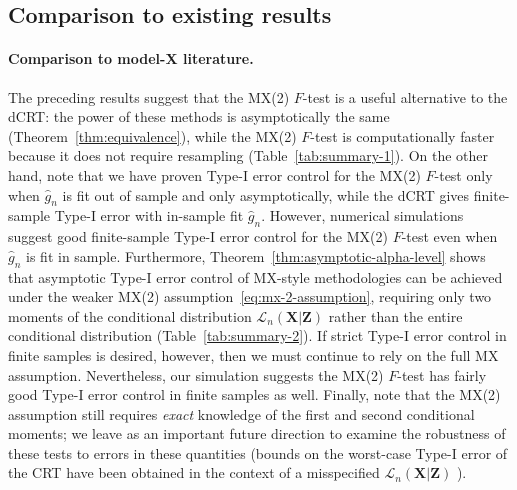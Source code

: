 \documentclass[12pt]{article}
\theoremstyle{definition}
\theoremstyle{remark}
\newcommand{\prx}{\bm X}
\newcommand{\prz}{\bm Z}
\newcommand{\pry}{{\bm Y}}
\begin{document}
\clearpage


\subsection{Comparison to existing results} \label{sec:comparison-to-existing-results-3}

\paragraph{Comparison to model-X literature.}

The preceding results suggest that the MX(2) $F$-test is a useful alternative to the dCRT: the power of these methods is asymptotically the same (Theorem~\ref{thm:equivalence}), while the MX(2) $F$-test is computationally faster because it does not require resampling (Table~\ref{tab:summary-1}). On the other hand, note that we have proven Type-I error control for the MX(2) $F$-test only when $\widehat g_n$ is fit out of sample and only asymptotically, while the dCRT gives finite-sample Type-I error with in-sample fit $\widehat g_n$. However, numerical simulations suggest good finite-sample Type-I error control for the MX(2) $F$-test even when $\widehat g_n$ is fit in sample. Furthermore, Theorem~\ref{thm:asymptotic-alpha-level} shows that asymptotic Type-I error control of MX-style methodologies can be achieved under the weaker MX(2) assumption~\eqref{eq:mx-2-assumption}, requiring only two moments of the conditional distribution $\mathcal L_n(\prx|\prz)$ rather than the entire conditional distribution (Table~\ref{tab:summary-2}). If strict Type-I error control in finite samples is desired, however, then we must continue to rely on the full MX assumption. Nevertheless, our simulation suggests the MX(2) $F$-test has fairly good Type-I error control in finite samples as well. Finally, note that the MX(2) assumption still requires \textit{exact} knowledge of the first and second conditional moments; we leave as an important future direction to examine the robustness of these tests to errors in these quantities (bounds on the worst-case Type-I error of the CRT have been obtained in the context of a misspecified $\mathcal L_n(\prx|\prz)$ \cite{Berrett2019}).


\end{document}
